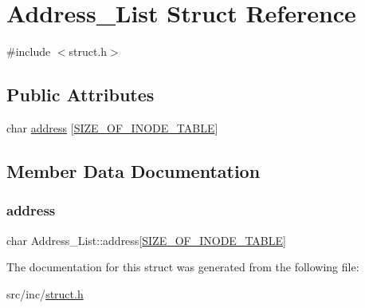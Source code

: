 \hypertarget{struct_address___list}{}\section{Address\+\_\+\+List Struct Reference}
\label{struct_address___list}


{\ttfamily \#include $<$struct.\+h$>$}

\subsection*{Public Attributes}
\begin{DoxyCompactItemize}
\item 
char \mbox{\hyperlink{struct_address___list_adbc2a3d6c4af71eb6265550bd768f4b0}{address}} \mbox{[}\mbox{\hyperlink{constants_8h_a9e9ec51f45d2519b8398860a837ba698}{S\+I\+Z\+E\+\_\+\+O\+F\+\_\+\+I\+N\+O\+D\+E\+\_\+\+T\+A\+B\+LE}}\mbox{]}
\end{DoxyCompactItemize}


\subsection{Member Data Documentation}
\mbox{\label{struct_address___list_adbc2a3d6c4af71eb6265550bd768f4b0}} 
\subsubsection{\texorpdfstring{address}{address}}
{\footnotesize\ttfamily char Address\+\_\+\+List\+::address\mbox{[}\mbox{\hyperlink{constants_8h_a9e9ec51f45d2519b8398860a837ba698}{S\+I\+Z\+E\+\_\+\+O\+F\+\_\+\+I\+N\+O\+D\+E\+\_\+\+T\+A\+B\+LE}}\mbox{]}}



The documentation for this struct was generated from the following file\+:\begin{DoxyCompactItemize}
\item 
src/inc/\mbox{\hyperlink{struct_8h}{struct.\+h}}\end{DoxyCompactItemize}
